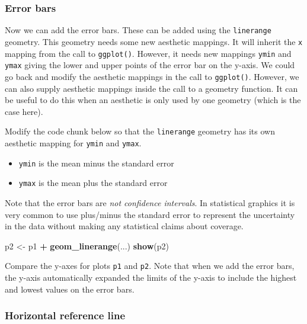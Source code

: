 \documentclass[
]{book}
\newenvironment{Shaded}{\begin{snugshade}}{\end{snugshade}}
\newcommand{\FunctionTok}[1]{\textcolor[rgb]{0.13,0.29,0.53}{\textbf{#1}}}
\newcommand{\NormalTok}[1]{#1}
\newcommand{\OtherTok}[1]{\textcolor[rgb]{0.56,0.35,0.01}{#1}}
\newcommand{\SpecialCharTok}[1]{\textcolor[rgb]{0.81,0.36,0.00}{\textbf{#1}}}
\providecommand{\tightlist}{%
  \setlength{\itemsep}{0pt}\setlength{\parskip}{0pt}}
\begin{document}
\subsubsection{Error bars}\label{error-bars}

Now we can add the error bars. These can be added using the \texttt{linerange} geometry. This geometry needs some new aesthetic mappings. It will inherit the \texttt{x} mapping from the call to \texttt{ggplot()}. However, it needs new mappings \texttt{ymin} and \texttt{ymax} giving the lower and upper points of the error bar on the y-axis. We could go back and modify the aesthetic mappings in the call to \texttt{ggplot()}. However, we can also supply aesthetic mappings inside the call to a geometry function. It can be useful to do this when an aesthetic is only used by one geometry (which is the case here).

Modify the code chunk below so that the \texttt{linerange} geometry has its own aesthetic mapping for \texttt{ymin} and \texttt{ymax}.

\begin{itemize}
\tightlist
\item
  \texttt{ymin} is the mean minus the standard error
\item
  \texttt{ymax} is the mean plus the standard error
\end{itemize}

Note that the error bars are \emph{not confidence intervals}. In statistical graphics it is very common to use plus/minus the standard error to represent the uncertainty in the data without making any statistical claims about coverage.

\begin{Shaded}
\begin{Highlighting}[]
\NormalTok{p2 }\OtherTok{\textless{}{-}}\NormalTok{ p1 }\SpecialCharTok{+} \FunctionTok{geom\_linerange}\NormalTok{(...)}
\FunctionTok{show}\NormalTok{(p2)}
\end{Highlighting}
\end{Shaded}

Compare the y-axes for plots \texttt{p1} and \texttt{p2}. Note that when we add the error bars, the y-axis automatically expanded the limits of the y-axis to include the highest and lowest values on the error bars.

\subsubsection{Horizontal reference line}\label{horizontal-reference-line}
\end{document}
